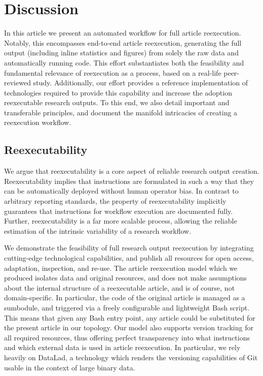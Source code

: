 \section{Discussion}

In this article we present an automated workflow for full article reexecution.
Notably, this encompasses end-to-end article reexecution, generating the full output (including inline statistics and figures) from solely the raw data and automatically running code.
This effort substantiates both the feasibility and fundamental relevance of reexecution as a process, based on a real-life peer-reviewed study.
Additionally, our effort provides a reference implementation of technologies required to provide this capability and increase the adoption reexecutable research outputs.
To this end, we also detail important and transferable principles, and document the manifold intricacies of creating a reexecution workflow.

\subsection{Reexecutability}
We argue that reexecutability is a core aspect of reliable research output creation.
Reexecutability implies that instructions are formulated in such a way that they can be automatically deployed without human operator bias.
In contrast to arbitrary reporting standards, the property of reexecutability implicitly guarantees that instructions for workflow execution are documented fully.
Further, reexecutability is a far more scalable process, allowing the reliable estimation of the intrinsic variability of a research workflow.

We demonstrate the feasibility of full research output reexecution by integrating cutting-edge technological capabilities, and publish all resources for open access, adaptation, inspection, and re-use.
The article reexecution model which we produced isolates data and original resources, and does not make assumptions about the internal structure of a reexecutable article, and is of course, not domain-specific.
In particular, the code of the original article is managed as a sumbodule, and triggered via a freely configurable and lightweight Bash script.
This means that given any Bash entry point, any article could be substituted for the present article in our topology.
Our model also supports version tracking for all required resources, thus offering perfect transparency into what instructions and which external data is used in article reexecution.
In particular, we rely heavily on DataLad, a technology which renders the versioning capabilities of Git usable in the context of large binary data.

